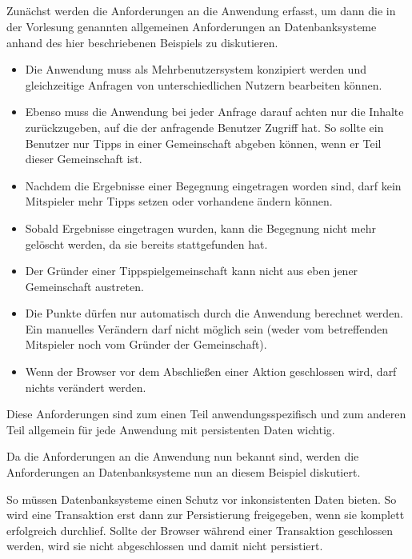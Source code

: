 \documentclass[ngerman]{gdb-aufgabenblatt}
\begin{document}
	\subsection{} %
		Zunächst werden die Anforderungen an die Anwendung erfasst, um dann die in der Vorlesung genannten allgemeinen Anforderungen an Datenbanksysteme anhand des hier beschriebenen Beispiels zu diskutieren.
		
		\begin{itemize}
			\item	Die Anwendung muss als Mehrbenutzersystem konzipiert werden und gleichzeitige Anfragen von unterschiedlichen Nutzern bearbeiten können. 
			\item	Ebenso muss die Anwendung bei jeder Anfrage darauf achten nur die Inhalte zurückzugeben, auf die der anfragende Benutzer Zugriff hat. So sollte ein Benutzer nur Tipps in einer Gemeinschaft abgeben können, wenn er Teil dieser Gemeinschaft ist.
			\item	Nachdem die Ergebnisse einer Begegnung eingetragen worden sind, darf kein Mitspieler mehr Tipps setzen oder vorhandene ändern können.
			\item	Sobald Ergebnisse eingetragen wurden, kann die Begegnung nicht mehr gelöscht werden, da sie bereits stattgefunden hat.
			\item	Der Gründer einer Tippspielgemeinschaft kann nicht aus eben jener Gemeinschaft austreten.
			\item	Die Punkte dürfen nur automatisch durch die Anwendung berechnet werden. Ein manuelles Verändern darf nicht möglich sein (weder vom betreffenden Mitspieler noch vom Gründer der Gemeinschaft).
			\item	Wenn der Browser vor dem Abschließen einer Aktion geschlossen wird, darf nichts verändert werden.
		\end{itemize}
		
		Diese Anforderungen sind zum einen Teil anwendungsspezifisch und zum anderen Teil allgemein für jede Anwendung mit persistenten Daten wichtig. 
		
		Da die Anforderungen an die Anwendung nun bekannt sind, werden die Anforderungen an Datenbanksysteme nun an diesem Beispiel diskutiert.
		
		So müssen Datenbanksysteme einen Schutz vor inkonsistenten Daten bieten. So wird eine Transaktion erst dann zur Persistierung freigegeben, wenn sie komplett erfolgreich durchlief. Sollte der Browser während einer Transaktion geschlossen werden, wird sie nicht abgeschlossen und damit nicht persistiert.
		
\end{document}
